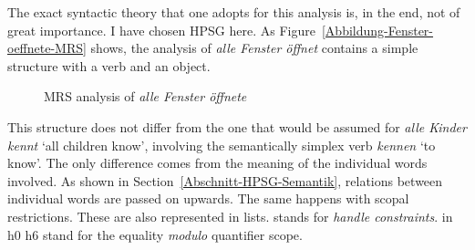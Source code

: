 The exact syntactic theory that one adopts for this analysis is, in the end, not of great importance.
I have chosen HPSG here. As Figure~\vref{Abbildung-Fenster-oeffnete-MRS} shows, the analysis of \emph{alle Fenster öffnet}
contains a simple structure with a verb and an object.
\begin{figure}
\caption{\label{Abbildung-Fenster-oeffnete-MRS}MRS analysis of \emph{alle Fenster öffnete}}
\end{figure}%
This structure does not differ from the one that would be assumed for \emph{alle Kinder kennt} `all
children know', involving the semantically simplex verb \emph{kennen} `to know'.
The only difference comes from the meaning of the individual words involved.
As shown in Section~\ref{Abschnitt-HPSG-Semantik}, relations between individual words are passed on upwards.
The same happens with scopal restrictions. These are also represented in lists. \hcons stands for \emph{handle constraints}.
\qeq in h0 \qeq h6 stand for the equality \emph{modulo} quantifier scope.


